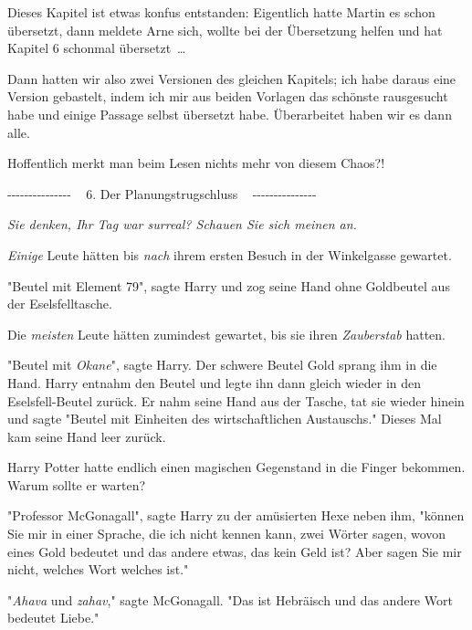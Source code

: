

\hypertarget{der-planungstrugschluss}{%

Dieses Kapitel ist etwas konfus entstanden: Eigentlich hatte Martin es schon übersetzt, dann meldete Arne sich, wollte bei der Übersetzung helfen und hat Kapitel 6 schonmal übersetzt~…

Dann hatten wir also zwei Versionen des gleichen Kapitels; ich habe daraus eine Version gebastelt, indem ich mir aus beiden Vorlagen das schönste rausgesucht habe und einige Passage selbst übersetzt habe. Überarbeitet haben wir es dann alle.

Hoffentlich merkt man beim Lesen nichts mehr von diesem Chaos?!

-\/-\/-\/-\/-\/-\/-\/-\/-\/-\/-\/-\/-\/-\/- ~ 6. Der Planungstrugschluss ~ -\/-\/-\/-\/-\/-\/-\/-\/-\/-\/-\/-\/-\/-\/-

\emph{Sie denken, Ihr Tag war surreal? Schauen Sie sich meinen an.}

\later

\emph{Einige} Leute hätten bis \emph{nach} ihrem ersten Besuch in der Winkelgasse gewartet.

"Beutel mit Element 79", sagte Harry und zog seine Hand ohne Goldbeutel aus der Eselsfelltasche.

Die \emph{meisten} Leute hätten zumindest gewartet, bis sie ihren \emph{Zauberstab} hatten.

"Beutel mit \emph{Okane}", sagte Harry. Der schwere Beutel Gold sprang ihm in die Hand. Harry entnahm den Beutel und legte ihn dann gleich wieder in den Eselsfell-Beutel zurück. Er nahm seine Hand aus der Tasche, tat sie wieder hinein und sagte "Beutel mit Einheiten des wirtschaftlichen Austauschs." Dieses Mal kam seine Hand leer zurück.

Harry Potter hatte endlich einen magischen Gegenstand in die Finger bekommen. Warum sollte er warten?

"Professor McGonagall", sagte Harry zu der amüsierten Hexe neben ihm, "können Sie mir in einer Sprache, die ich nicht kennen kann, zwei Wörter sagen, wovon eines Gold bedeutet und das andere etwas, das kein Geld ist? Aber sagen Sie mir nicht, welches Wort welches ist."

"\emph{Ahava} und \emph{zahav}," sagte McGonagall. "Das ist Hebräisch und das andere Wort bedeutet Liebe."

}
